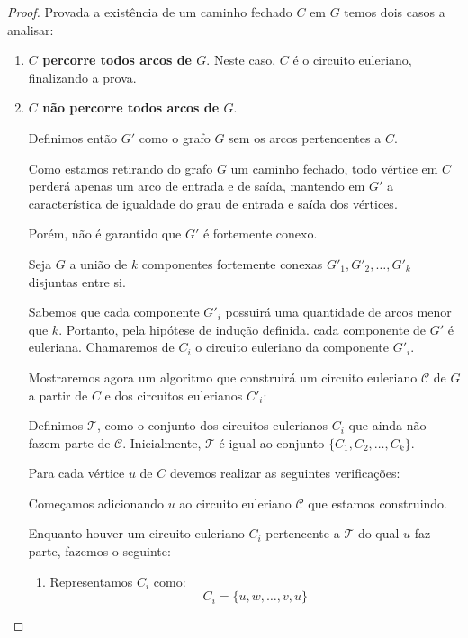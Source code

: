 \begin{proof}
    Provada a existência de um caminho fechado $C$ em $G$ temos dois casos a analisar:

    \begin{enumerate}
        \item \textbf{$C$ percorre todos arcos de $G$}.
            Neste caso, $C$ é o circuito euleriano, finalizando a prova.

        \item \textbf{$C$ não percorre todos arcos de $G$}.

            Definimos então $G'$ como o grafo $G$ sem os arcos pertencentes a $C$.

            Como estamos retirando do grafo $G$ um caminho fechado, todo vértice em $C$ perderá apenas um arco de entrada e de saída, mantendo em $G'$ a característica de igualdade do grau de entrada e saída dos vértices.

            Porém, não é garantido que $G'$ é fortemente conexo. 

            Seja $G$ a união de $k$ componentes fortemente conexas $G'_1, G'_2, \dots, G'_k$ disjuntas entre si.

            Sabemos que cada componente $G'_i$ possuirá uma quantidade de arcos menor que $k$. 
            Portanto, pela hipótese de indução definida. cada componente de $G'$ é euleriana.
            Chamaremos de $C_i$ o circuito euleriano da componente $G'_i$.

            Mostraremos agora um algoritmo que construirá um circuito euleriano $\mathcal{C}$ de $G$ a partir de $C$ e dos circuitos eulerianos $C'_i$:


            Definimos $\mathcal{T}$, como o conjunto dos circuitos eulerianos $C_i$ que ainda não fazem parte de $\mathcal{C}$. 
            Inicialmente, $\mathcal{T}$ é igual ao conjunto $\{C_1, C_2, \dots, C_k\}$.


            Para cada vértice $u$ de $C$ devemos realizar as seguintes verificações:

            \begin{tcolorbox}

                Começamos adicionando $u$ ao circuito euleriano $\mathcal{C}$ que estamos construindo.

                Enquanto houver um circuito euleriano $C_i$ pertencente a $\mathcal{T}$ do qual $u$ faz parte, fazemos o seguinte:


                \begin{enumerate}
                    \item Representamos $C_i$ como: 
                        \[
                            C_i = \{u, w, \dots, v, u\}
                        \]


\end{enumerate}
\end{tcolorbox}
\end{enumerate}
\end{proof}
